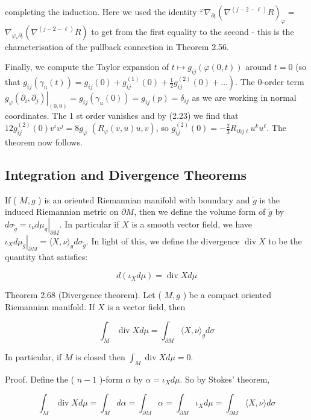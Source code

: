 \documentclass[10pt, letterpaper]{article}
\begin{document}
completing the induction. Here we used the identity ${ }^{\varphi} \nabla_{\partial_{t}}\left(\nabla^{(j-2-\ell)} R\right)_{\varphi}=$ $\nabla_{\varphi_{*} \partial_{t}}\left(\nabla^{(j-2-\ell)} R\right)$ to get from the first equality to the second - this is the characterisation of the pullback connection in Theorem 2.56.

Finally, we compute the Taylor expansion of $t \mapsto g_{i j}(\varphi(0, t))$ around $t=0$ (so that $\left.g_{i j}\left(\gamma_{u}(t)\right)=g_{i j}(0)+g_{i j}^{(1)}(0)+\frac{1}{2} g_{i j}^{(2)}(0)+\ldots\right)$. The 0-order term $\left.g_{\varphi}\left(\partial_{i}, \partial_{j}\right)\right|_{(0,0)}=g_{i j}\left(\gamma_{u}(0)\right)=g_{i j}(p)=\delta_{i j}$ as we are working in normal coordinates. The 1 st order vanishes and by (2.23) we find that $12 g_{i j}^{(2)}(0) v^{i} v^{j}=8 g_{\varphi}$ $\left(R_{\varphi}(v, u) u, v\right)$, so $g_{i j}^{(2)}(0)=-\frac{2}{3} R_{i k j \ell} u^{k} u^{\ell}$. The theorem now follows.

\subsection*{Integration and Divergence Theorems}
If ( $M, g$ ) is an oriented Riemannian manifold with boundary and $\widetilde{g}$ is the induced Riemannian metric on $\partial M$, then we define the volume form of $\widetilde{g}$ by $d \sigma_{\tilde{g}}=\left.\iota_{\nu} d \mu_{g}\right|_{\partial M}$. In particular if $X$ is a smooth vector field, we have $\left.\iota_{X} d \mu_{g}\right|_{\partial M}=\langle X, \nu\rangle_{g} d \sigma_{\tilde{g}}$. In light of this, we define the divergence $\operatorname{div} X$ to be the quantity that satisfies:

$$
d\left(\iota_{X} d \mu\right)=\operatorname{div} X d \mu
$$

Theorem 2.68 (Divergence theorem). Let ( $M, g$ ) be a compact oriented Riemannian manifold. If $X$ is a vector field, then

$$
\int_{M} \operatorname{div} X d \mu=\int_{\partial M}\langle X, \nu\rangle_{g} d \sigma
$$

In particular, if $M$ is closed then $\int_{M} \operatorname{div} X d \mu=0$.

Proof. Define the ( $n-1$ )-form $\alpha$ by $\alpha=\iota_{X} d \mu$. So by Stokes' theorem,

$$
\int_{M} \operatorname{div} X d \mu=\int_{M} d \alpha=\int_{\partial M} \alpha=\int_{\partial M} \iota_{X} d \mu=\int_{\partial M}\langle X, \nu\rangle d \sigma
$$
\end{document}

